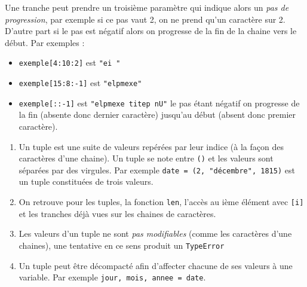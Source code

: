 \documentclass[11pt,a4paper]{article}
\begin{document}
\begin{tcolorbox}[left=0cm,title=\bf{\faPython \; Tranches},colbacktitle=cfond]
\begin{enumerate}
	Une tranche peut prendre un troisième paramètre qui indique alors un \textit{pas de progression}, par exemple si ce pas vaut 2, on ne prend qu'un caractère sur 2. D'autre part si le pas est négatif alors on progresse de la fin de la chaine vers le début. Par exemples :
	\begin{itemize}
		\item[\textbullet] \texttt{exemple[4:10:2]} est {\tt "ei "}
		\item[\textbullet] \texttt{exemple[15:8:-1]} est {\tt "elpmexe"} 
		\item[\textbullet] \texttt{exemple[::-1]} est {\tt "elpmexe titep nU"} le pas étant négatif on progresse de la fin (absente donc dernier caractère) jusqu'au début (absent donc premier caractère).
	\end{itemize}	
	\end{enumerate}
	\end{tcolorbox}
	
	\begin{tcolorbox}[left=0cm,title=\bf{\faPython \; Tuples},colbacktitle=cfond]
		\begin{enumerate}
			\item[\ding{182}] Un tuple est une suite de valeurs repérées par leur indice (à la façon des caractères d'une chaine). Un tuple se note entre {\tt ()} et les valeurs sont séparées par des virgules. Par exemple \texttt{date = (2, "décembre", 1815)} est un tuple constituées de trois valeurs.
			\item[\ding{183}] On retrouve pour les tuples, la fonction {\tt len}, l'accès au  ième élément avec {\tt [i]} et les tranches déjà vues sur les chaines de caractères.
			\item[\ding{184}] Les valeurs d'un tuple ne sont \textit{pas modifiables} (comme les caractères d'une chaines), une tentative en ce sens produit un {\tt TypeError}
			\item[\ding{185}] Un tuple peut être décompacté afin d'affecter chacune de ses valeurs à une variable. Par exemple \texttt{jour, mois, annee = date}.
		\end{enumerate}
	\end{tcolorbox}
	
\end{document}
